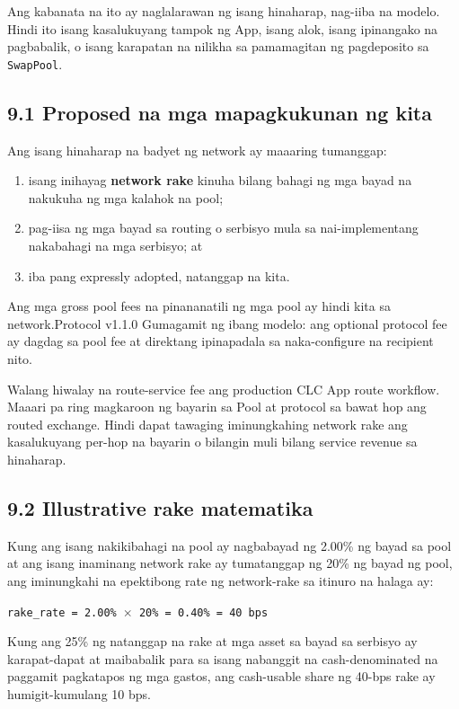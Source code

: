 \documentclass[11pt]{article}
\begin{document}
Ang kabanata na ito ay naglalarawan ng isang hinaharap, nag-iiba na modelo. Hindi ito isang kasalukuyang tampok ng App, isang alok, isang ipinangako na pagbabalik, o isang karapatan na nilikha sa pamamagitan ng pagdeposito sa \texttt{SwapPool}.

\subsection*{9.1 Proposed na mga mapagkukunan ng kita}

Ang isang hinaharap na badyet ng network ay maaaring tumanggap:

\begin{enumerate}[leftmargin=*]
\item isang inihayag \textbf{network rake} kinuha bilang bahagi ng mga bayad na nakukuha ng mga kalahok na pool;
\item pag-iisa ng mga bayad sa routing o serbisyo mula sa nai-implementang nakabahagi na mga serbisyo; at
\item iba pang expressly adopted, natanggap na kita.
\end{enumerate}
Ang mga gross pool fees na pinananatili ng mga pool ay hindi kita sa network.Protocol v1.1.0 Gumagamit ng ibang modelo: ang optional protocol fee ay dagdag sa pool fee at direktang ipinapadala sa naka-configure na recipient nito.

Walang hiwalay na route-service fee ang production CLC App route workflow. Maaari pa ring magkaroon ng bayarin sa Pool at protocol sa bawat hop ang routed exchange. Hindi dapat tawaging iminungkahing network rake ang kasalukuyang per-hop na bayarin o bilangin muli bilang service revenue sa hinaharap.

\subsection*{9.2 Illustrative rake matematika}

Kung ang isang nakikibahagi na pool ay nagbabayad ng 2.00\% ng bayad sa pool at ang isang inaminang network rake ay tumatanggap ng 20\% ng bayad ng pool, ang iminungkahi na epektibong rate ng network-rake sa itinuro na halaga ay:

\texttt{rake\_rate = 2.00\% $\times$ 20\% = 0.40\% = 40 bps}

Kung ang 25\% ng natanggap na rake at mga asset sa bayad sa serbisyo ay karapat-dapat at maibabalik para sa isang nabanggit na cash-denominated na paggamit pagkatapos ng mga gastos, ang cash-usable share ng 40-bps rake ay humigit-kumulang 10 bps.
\end{document}
